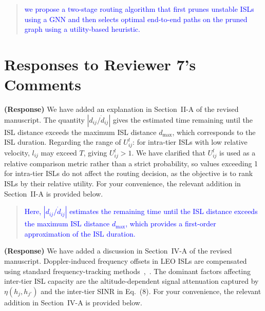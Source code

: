 \documentclass[letter]{article}
\begin{document}
\begin{quote}
\textcolor{blue}{we propose a two-stage routing algorithm that first prunes unstable ISLs using a GNN and then selects optimal end-to-end paths on the pruned graph using a utility-based heuristic.}
\end{quote}

\newpage
\vspace{0.1cm} \noindent
\section*{\large Responses to Reviewer 7's Comments}

\noindent {}

\vspace{5mm}
{\bf (Response)}
We have added an explanation in Section~II-A of the revised manuscript. The quantity $|d_{ij}/\dot{d}_{ij}|$ gives the estimated time remaining until the ISL distance exceeds the maximum ISL distance $d_{\max}$, which corresponds to the ISL duration. Regarding the range of $U_{ij}^l$: for intra-tier ISLs with low relative velocity, $l_{ij}$ may exceed $T$, giving $U_{ij}^l > 1$. We have clarified that $U_{ij}^l$ is used as a relative comparison metric rather than a strict probability, so values exceeding 1 for intra-tier ISLs do not affect the routing decision, as the objective is to rank ISLs by their relative utility. For your convenience, the relevant addition in Section~II-A is provided below.

\begin{quote}
\textcolor{blue}{Here, $|d_{ij}/\dot{d}_{ij}|$ estimates the remaining time until the ISL distance exceeds the maximum ISL distance $d_{\max}$, which provides a first-order approximation of the ISL duration.}
\end{quote}

\vspace{10mm}
\noindent {}

\vspace{5mm}
{\bf (Response)}
We have added a discussion in Section~IV-A of the revised manuscript. Doppler-induced frequency offsets in LEO ISLs are compensated using standard frequency-tracking methods~\cite{darsena2024hybrid},~\cite{cao2025dense}. The dominant factors affecting inter-tier ISL capacity are the altitude-dependent signal attenuation captured by $\eta(h_j, h_{j'})$ and the inter-tier SINR in Eq.~(8). For your convenience, the relevant addition in Section~IV-A is provided below.
\end{document}
